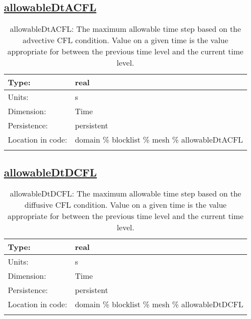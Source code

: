 \subsection[allowableDtACFL]{\hyperref[sec:var_tab_mesh]{allowableDtACFL}}
\label{subsec:var_sec_mesh_allowableDtACFL}
\begin{center}
\begin{longtable}{| p{2.0in} | p{4.0in} |}
        \hline 
        Type: & real \\
        \hline 
        Units: & \si{s} \\
        \hline 
        Dimension: & Time \\
        \hline 
        Persistence: & persistent \\
        \hline 
         Location in code: & domain \% blocklist \% mesh \% allowableDtACFL \\
         \hline 
    \caption{allowableDtACFL: The maximum allowable time step based on the advective CFL condition.  Value on a given time is the value appropriate for  between the previous time level and the current time level.}
\end{longtable}
\end{center}
\subsection[allowableDtDCFL]{\hyperref[sec:var_tab_mesh]{allowableDtDCFL}}
\label{subsec:var_sec_mesh_allowableDtDCFL}
\begin{center}
\begin{longtable}{| p{2.0in} | p{4.0in} |}
        \hline 
        Type: & real \\
        \hline 
        Units: & \si{s} \\
        \hline 
        Dimension: & Time \\
        \hline 
        Persistence: & persistent \\
        \hline 
         Location in code: & domain \% blocklist \% mesh \% allowableDtDCFL \\
         \hline 
    \caption{allowableDtDCFL: The maximum allowable time step based on the diffusive CFL condition.  Value on a given time is the value appropriate for  between the previous time level and the current time level.}
\end{longtable}
\end{center}
